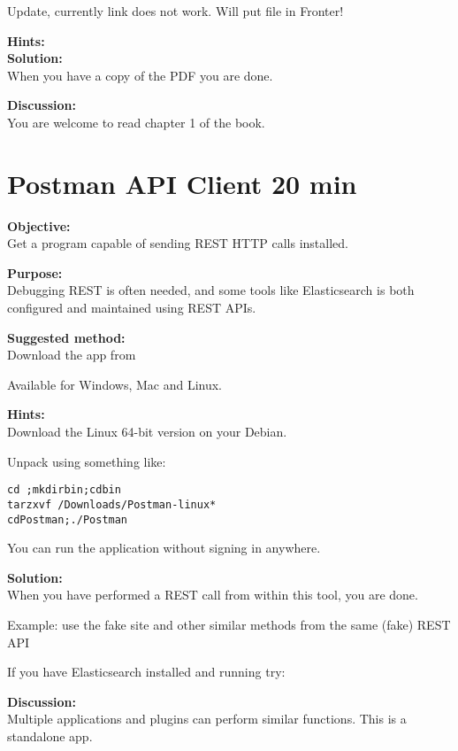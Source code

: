 \documentclass[a4paper,11pt,notitlepage]{report}
\begin{document}
Update, currently link does not work. Will put file in Fronter!

{\bf Hints:}\\

{\bf Solution:}\\
When you have a copy of the PDF you are done.

{\bf Discussion:}\\
You are welcome to read chapter 1 of the book.




\chapter{Postman API Client 20 min}
\label{ex:postman-api}


{\bf Objective:}\\
Get a program capable of sending REST HTTP calls installed.


{\bf Purpose:}\\
Debugging REST is often needed, and some tools like Elasticsearch is both configured and maintained using REST APIs.

{\bf Suggested method:}\\
Download the app from

Available for Windows, Mac and Linux.

{\bf Hints:}\\
Download the Linux 64-bit version on your Debian.

Unpack using something like:
\begin{alltt}
cd ~;mkdir bin;cd bin
tar zxvf ~/Downloads/Postman-linux*
cd Postman;./Postman
\end{alltt}

You can run the application without signing in anywhere.

{\bf Solution:}\\
When you have performed a REST call from within this tool, you are done.

Example: use the fake site  and other similar methods from the same (fake) REST API

If you have Elasticsearch installed and running try: 

{\bf Discussion:}\\
Multiple applications and plugins can perform similar functions. This is a standalone app.
\end{document}
